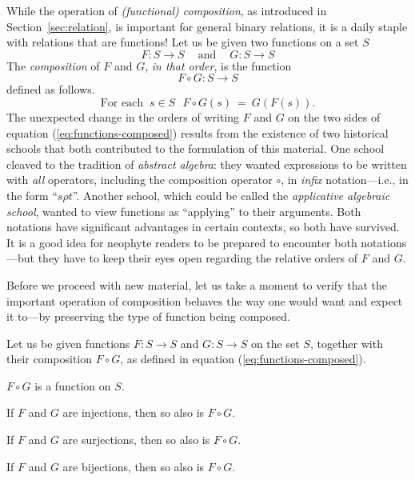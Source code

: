  
While the operation of {\it (functional) composition}, as introduced in Section~\ref{sec:relation}, is important for general binary relations, it is a daily staple with relations that are functions!  Let us be given two functions on a set $S$
\[
F: S \rightarrow S \ \ \ \ \mbox{ and } \ \ \ \ G: S \rightarrow S
\]
The {\it composition} of $F$ and $G$, {\em in that order}, is the function
\[ F \circ G: S \rightarrow S \]
defined as follows.
\begin{equation}
\label{eq:functions-composed}
\mbox{For each } \ s \in S \ \ \
F \circ G(s) \ = \ G(F(s)).
\end{equation}
The unexpected change in the orders of writing $F$ and $G$ on the two sides of equation (\ref{eq:functions-composed}) results from the existence of two historical schools that both contributed to the formulation of this material.  One school cleaved to the tradition of {\it abstract algebra}:  they wanted expressions to be written with {\em all} operators, including the composition operator $\circ$, in {\em infix} notation---i.e., in the form ``$s \rho t$''.  Another school, which could be called the {\it applicative algebraic school}, wanted to view functions as ``applying'' to their arguments.  Both notations have significant advantages in certain contexts, so both have survived.  It is a good idea for neophyte readers to be prepared to encounter both notations---but they have to keep their eyes open regarding the relative orders of $F$ and
$G$.  \index{composition!functions!notation}

\medskip

Before we proceed with new material, let us take a moment to verify that the important operation of composition behaves the way one would want and expect it to---by preserving the type of function being composed.

\begin{prop}
\label{thm:fn-composition}
Let us be given functions $F: S \rightarrow S$ and $G: S \rightarrow S$ on the set $S$, together with their composition $F \circ G$, as defined in equation (\ref{eq:functions-composed}).

$F \circ G$ is a function on $S$.

If $F$ and $G$ are injections, then so also is $F \circ G$.

If $F$ and $G$ are surjections, then so also is $F \circ G$.

If $F$ and $G$ are bijections, then so also is $F \circ G$.
\end{prop}

